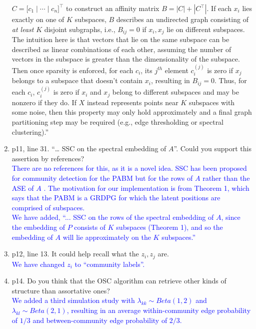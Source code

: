 \documentclass[
]{article}
\begin{document}
\begin{enumerate}
{  \(C = \bigl[ c_1 \mid \cdots \mid c_n \bigr]^\top\) to
  construct an affinity matrix \(B = |C| + |C^\top|\). If each \(x_i\) lies
  exactly on one of \(K\) subspaces, \(B\) describes an undirected graph
  consisting of {\em at least} \(K\) disjoint subgraphs, i.e., \(B_{ij} = 0\) if \(x_i, x_j\) lie on different subspaces. 
  The intuition here is that vectors that lie on the same subspace can be described as linear combinations of each other, assuming the number of vectors in the subspace is greater than the dimensionality of the subspace. 
  Then once sparsity is enforced, for each $c_i$, its $j^{th}$ element $c_i^{(j)}$ is zero if $x_j$ belongs to a subspace that doesn't contain $x_i$, resulting in $B_{ij} = 0$. 
  Thus, for each $c_i$, $c_i^{(j)}$ is zero if $x_i$ and $x_j$ belong to different subspaces and may be nonzero if they do. 
  If \(X\) instead represents points near \(K\) subspaces with some noise, 
  then this property may only hold approximately and 
  a final graph partitioning step may be required 
  (e.g., edge thresholding or spectral clustering).''
  }
\item
  p11, line 31. ``\ldots{} SSC on the spectral embedding of \(A\)''.
  Could you support this assertion by references?\\
  \textcolor{blue}{
  There are no references for this, as it is a novel idea. 
  SSC has been proposed for community detection for the PABM but for the rows of $A$ rather than the ASE of $A$ \citep{noroozi2019estimation}. 
  The motivation for our implementation is from Theorem 1, which says that the PABM is a GRDPG for which the latent positions are comprised of subspaces. 
  }\\
  \textcolor{blue}{
  We have added, ``... SSC on the rows of the spectral embedding of $A$, since the embedding of $P$ consists of $K$ subspaces (Theorem 1), and so the embedding of $A$ will lie approximately on the $K$ subspaces.''
  }
\item
  p12, line 13. It could help recall what the \(z_i, z_j\) are.\\
  \textcolor{blue}{
  We have changed $z_i$ to ``community labels''.
  }
\item
  p14. Do you think that the OSC algorithm can retrieve other kinds of
  structure than assortative ones?\\
  \textcolor{blue}{
  We added a third simulation study with $\lambda_{kk} \sim Beta(1,2)$ and $\lambda_{kl} \sim Beta(2,1)$, resulting in an average within-community edge probability of $1/3$ and between-community edge probability of $2/3$. 
}
\end{enumerate}
\end{document}

